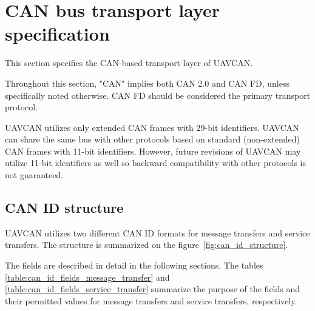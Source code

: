 \section{CAN bus transport layer specification}

This section specifies the CAN-based transport layer of UAVCAN.

Throughout this section, "CAN" implies both CAN 2.0 and CAN FD, unless specifically noted otherwise.
CAN FD should be considered the primary transport protocol.

UAVCAN utilizes only extended CAN frames with 29-bit identifiers.
UAVCAN can share the same bus with other protocols based on standard (non-extended) CAN frames with 11-bit identifiers.
However, future revisions of UAVCAN may utilize 11-bit identifiers as well so backward compatibility 
with other protocols is not guaranteed.

\subsection{CAN ID structure}

UAVCAN utilizes two different CAN ID formats for message transfers and service transfers.
The structure is summarized on the figure~\ref{fig:can_id_structure}.

The fields are described in detail in the following sections.
The tables \ref{table:can_id_fields_message_transfer} and \ref{table:can_id_fields_service_transfer}
summarize the purpose of the fields and their permitted values
for message transfers and service transfers, respectively.

